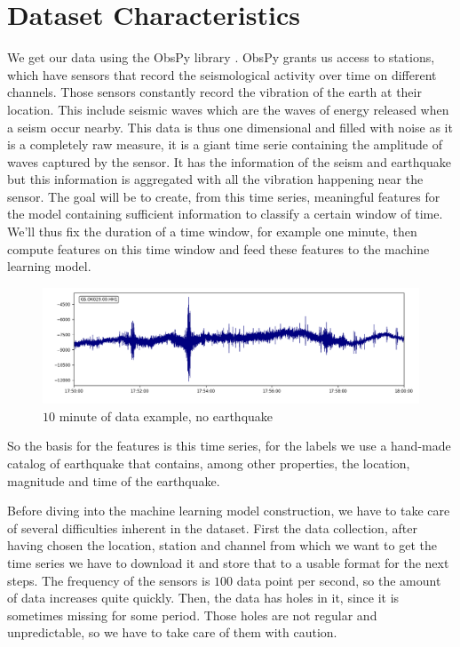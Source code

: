\documentclass[10pt,conference,compsocconf]{IEEEtran}
\begin{document}
\section{Dataset Characteristics}
We get our data using the ObsPy library \cite{obspy}. ObsPy grants us access to stations, which have sensors that record the seismological activity over time on different channels. Those sensors constantly record  the vibration of the earth at their location. This include seismic waves which are the waves of energy released when a seism occur nearby. This data is thus one dimensional and filled with noise as it is a completely raw measure, it is a giant time serie containing the amplitude of waves captured by the sensor. It has the information of the seism and earthquake but this information is aggregated with all the vibration happening near the sensor. The goal will be to create, from this time series, meaningful features for the model containing sufficient information to classify a certain window of time. We'll thus fix the duration of a time window, for example one minute, then compute features on this time window and feed these features to the machine learning model.

\begin{figure}[h]
  \centering
	\includegraphics[width=\columnwidth]{10min-example-2018-06-30T17:50_1.png}
  \caption{$10$ minute of data example, no earthquake}
	\label{fig:10min-example}
\end{figure}

So the basis for the features is this time series, for the labels we use a hand-made catalog of earthquake that contains, among other properties, the location, magnitude and time of the earthquake.

Before diving into the machine learning model construction, we have to take care of several difficulties inherent in the dataset.\newline
First the data collection, after having chosen the location, station and channel from which we want to get the time series we have to download it and store that to a usable format for the next steps. The frequency of the sensors is $100$ data point per second, so the amount of data increases quite quickly. Then, the data has holes in it, since it is sometimes missing for some period. Those holes are not regular and unpredictable, so we have to take care of them with caution.
\end{document}
